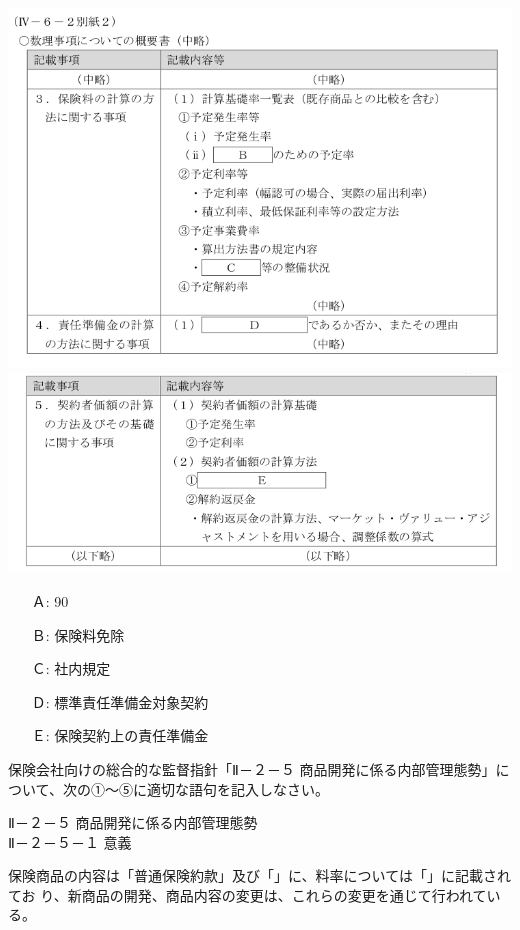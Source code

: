 \documentclass[report,gutter=10mm,fore-edge=10mm,uplatex,dvipdfmx]{jlreq}
\begin{document}
\includegraphics[scale=0.5]{./images/Prob2020-1-1-1-1.png}\\
\includegraphics[scale=0.5]{./images/Prob2020-1-1-1-2.png}

\answer{}

\begin{itemize}
\item[ Ａ:]  90 
\item[ Ｂ:]  保険料免除 
\item[ Ｃ:]  社内規定 
\item[ Ｄ:]  標準責任準備金対象契約 
\item[ Ｅ:]  保険契約上の責任準備金
\end{itemize}

保険会社向けの総合的な監督指針「Ⅱ－２－５ 商品開発に係る内部管理態勢」について、次の①～⑤に適切な語句を記入しなさい。

\noindent{}Ⅱ－２－５ 商品開発に係る内部管理態勢\\
Ⅱ－２－５－１ 意義

保険商品の内容は「普通保険約款」及び「」に、料率については「」に記載されてお
り、新商品の開発、商品内容の変更は、これらの変更を通じて行われている。
\end{document}
